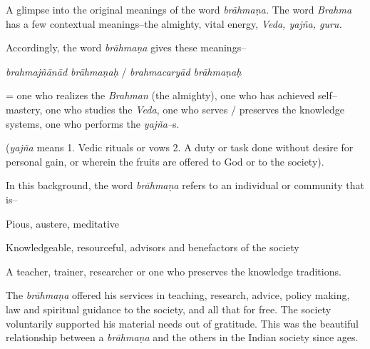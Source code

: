 A glimpse into the original meanings of the word \textit{brāhmaṇa.} The word \textit{Brahma} has a few contextual meanings–the almighty, vital energy, \textit{Veda, yajña, guru.}

Accordingly, the word \textit{brāhmaṇa} gives these meanings–

\textit{brahmajñānād brāhmaṇaḥ} / \textit{brahmacaryād brāhmaṇaḥ}

= one who realizes the \textit{Brahman} (the almighty), one who has achieved self–mastery, one who studies the \textit{Veda}, one who serves / preserves the knowledge systems, one who performs the \textit{yajña–}s.

(\textit{yajña} means 1. Vedic rituals or vows 2. A duty or task done without desire for personal gain, or wherein the fruits are offered to God or to the society). 

In this background, the word \textit{brāhmaṇa} refers to an individual or community that is–

\item Pious, austere, meditative 

 \item Knowledgeable, resourceful, advisors and benefactors of the society 

 \item A teacher, trainer, researcher or one who preserves the knowledge traditions.

The \textit{brāhmaṇa} offered his services in teaching, research, advice, policy making, law and spiritual guidance to the society, and all that for free. The society voluntarily supported his material needs out of gratitude. This was the beautiful relationship between a \textit{brāhmaṇa} and the others in the Indian society since ages.

